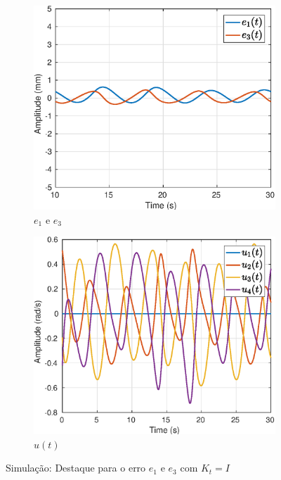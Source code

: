 \begin{figure}[H]
\centering
\begin{subfigure}{.5\textwidth}
  \centering
  \includegraphics[width=\linewidth]{./img/simul_delay_zoh1/error.eps}
  \caption{$e_1$ e $e_3$}
  \label{fig:simul_erro}
\end{subfigure}%
\begin{subfigure}{.5\textwidth}
  \centering
  \includegraphics[width=\linewidth]{./img/simul_delay_zoh1/u.eps}
  \caption{${u}(t)$}
  \label{fig:simul_u}
\end{subfigure}
\caption{Simulação: Destaque para o erro $e_1$ e $e_3$ com ${K}_t = {I}$}
\label{fig:simul_erro_traj}
\end{figure}


